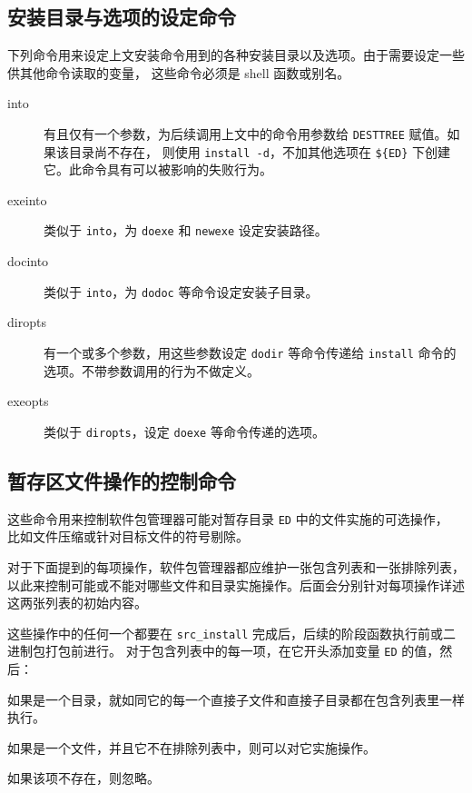 \subsection{安装目录与选项的设定命令}
\label{sec:commands-affecting-install-destinations}
下列命令用来设定上文安装命令用到的各种安装目录以及选项。由于需要设定一些供其他命令读取的变量，
这些命令必须是 shell 函数或别名。

\begin{description}

\item[into] 有且仅有一个参数，为后续调用上文中的命令用参数给 \texttt{DESTTREE} 赋值。如果该目录尚不存在，
    则使用 \texttt{install -d}，不加其他选项在 \texttt{\$\{ED\}} 下创建它。此命令具有可以被影响的失败行为。

\item[exeinto] 类似于 \texttt{into}，为 \texttt{doexe} 和 \texttt{newexe} 设定安装路径。

\item[docinto] 类似于 \texttt{into}，为 \texttt{dodoc} 等命令设定安装子目录。

\item[diropts] 有一个或多个参数，用这些参数设定 \texttt{dodir} 等命令传递给
    \texttt{install} 命令的选项。不带参数调用的行为不做定义。

\item[exeopts] 类似于 \texttt{diropts}，设定 \texttt{doexe} 等命令传递的选项。

\end{description}

\subsection{暂存区文件操作的控制命令}
\label{sec:commands-controlling-manipulation}
这些命令用来控制软件包管理器可能对暂存目录 \texttt{ED} 中的文件实施的可选操作，
比如文件压缩或针对目标文件的符号剔除。

对于下面提到的每项操作，软件包管理器都应维护一张包含列表和一张排除列表，
以此来控制可能或不能对哪些文件和目录实施操作。后面会分别针对每项操作详述这两张列表的初始内容。

这些操作中的任何一个都要在 \texttt{src_install} 完成后，后续的阶段函数执行前或二进制包打包前进行。
对于包含列表中的每一项，在它开头添加变量 \texttt{ED} 的值，然后：

\begin{compactitem}
\item 如果是一个目录，就如同它的每一个直接子文件和直接子目录都在包含列表里一样执行。
\item 如果是一个文件，并且它不在排除列表中，则可以对它实施操作。
\item 如果该项不存在，则忽略。
\end{compactitem}

